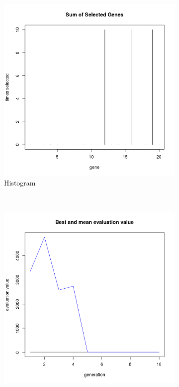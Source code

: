 \documentclass{llncs}
\begin{document}
\begin{figure}[H]
        \centering
        \begin{subfigure}[b]{0.5\textwidth}
                \includegraphics[width=\textwidth]{img/hist_small}
                \caption{Histogram}
                \label{fig:gull}
        \end{subfigure}%
        ~ %
        \begin{subfigure}[b]{0.5\textwidth}
                \includegraphics[width=\textwidth]{img/plot_small}

\end{subfigure}
\end{figure}
\end{document}
